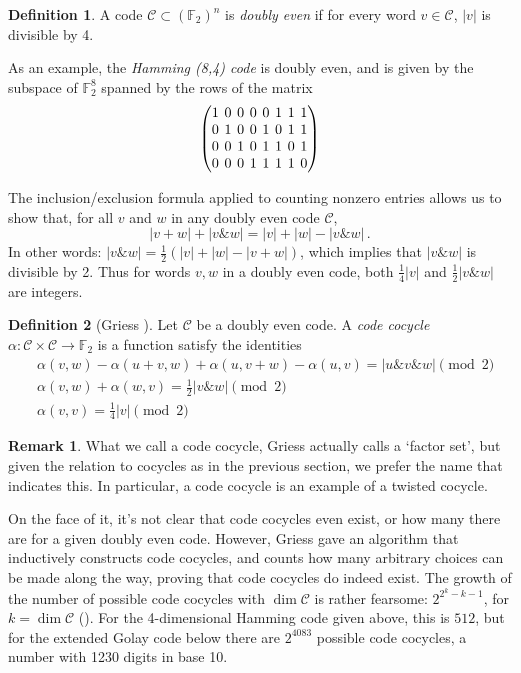 \documentclass{article}
\theoremstyle{plain}
\theoremstyle{definition}
\newtheorem*{definition}{Definition}
\newtheorem*{remark}{Remark}
\def \cC {\mathcal{C}}
\def \FF {\mathbb{F}}
\newcommand{\AND}{\mathbin{\texttt{\&}}}
\begin{document}
\begin{definition}
A code $\cC \subset (\FF_2)^n$ is \emph{doubly even} if for every word $v\in \cC$, $|v|$ is divisible by 4. 
\end{definition}


As an example, the \emph{Hamming (8,4) code} is doubly even, and is given by the subspace of $\FF_2^8$ spanned by the rows of the matrix
\[
\begingroup %
\setlength\arraycolsep{2pt}
\begin{pmatrix}
1&0&0&0&0&1&1&1\\
0&1&0&0&1&0&1&1\\
0&0&1&0&1&1&0&1\\
0&0&0&1&1&1&1&0
\end{pmatrix}
\endgroup
\]

The inclusion/exclusion formula applied to counting nonzero entries allows us to show that, for all $v$ and $w$ in any doubly even code $\cC$,
\[
	|v+w| + |v\AND w| = |v| + |w| - |v\AND w|\,.
\]
In other words: $|v\AND w| = \frac12(|v| + |w| - |v+w|)$, which implies that $|v\AND w|$ is divisible by 2.
Thus for words $v,w$ in a doubly even code, both $\frac14|v|$ and $\frac12|v\AND w|$ are integers.

\begin{definition}[Griess \cite{Griess}]
Let $\cC$ be a doubly even code. 
A \emph{code cocycle} $\alpha\colon \cC \times \cC \to \FF_2$ is a  function satisfy the identities
\begin{align}
& \alpha(v,w)-\alpha(u+v,w)+\alpha(u,v+w)-\alpha(u,v) =|u\AND v \AND w| \pmod 2 \label{eq: code cocycle 1}\\
& \alpha(v,w)+\alpha(w,v) = {}  \tfrac12|v\AND w| \pmod 2 \label{eq: code cocycle 2}\\
& \alpha(v,v) = {}  \tfrac14|v| \pmod 2\label{eq: code cocycle 3}
\end{align}
\end{definition}

\begin{remark}
What we call a code cocycle, Griess actually calls a `factor set', but given the relation to cocycles as in the previous section, we prefer the name that indicates this.
In particular, a code cocycle is an example of a twisted cocycle.
\end{remark}

On the face of it, it's not clear that code cocycles even exist, or how many there are for a given doubly even code. 
However, Griess gave an algorithm that inductively constructs code cocycles, and counts how many arbitrary choices can be made along the way, proving that code cocycles do indeed exist.
The growth of the number of possible code cocycles with $\dim \cC$ is rather fearsome: $2^{2^k-k-1}$, for $k=\dim \cC$ (\cite[Theorem 10]{Griess}).
For the 4-dimensional Hamming code given above, this is $512$, but for the extended Golay code below there are $2^{4083}$ possible code cocycles, a number with 1230 digits in base 10.
\end{document}
